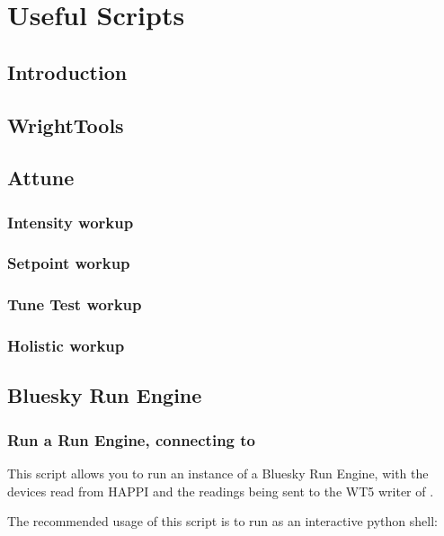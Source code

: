 \chapter{Useful Scripts} \label{cha:scripts}

\clearpage

\section{Introduction}  
\clearpage

\section{WrightTools}  
\section{Attune}  

\subsection{Intensity workup}

\subsection{Setpoint workup}

\subsection{Tune Test workup}

\subsection{Holistic workup}

\section{Bluesky Run Engine}  


\subsection{Run a Run Engine, connecting to \biab}
\label{apx:script:re}

This script allows you to run an instance of a Bluesky Run Engine, with the devices read from HAPPI and the readings being sent to the WT5 writer of \biab.

The recommended usage of this script is to run as an interactive python shell:



\clearpage
